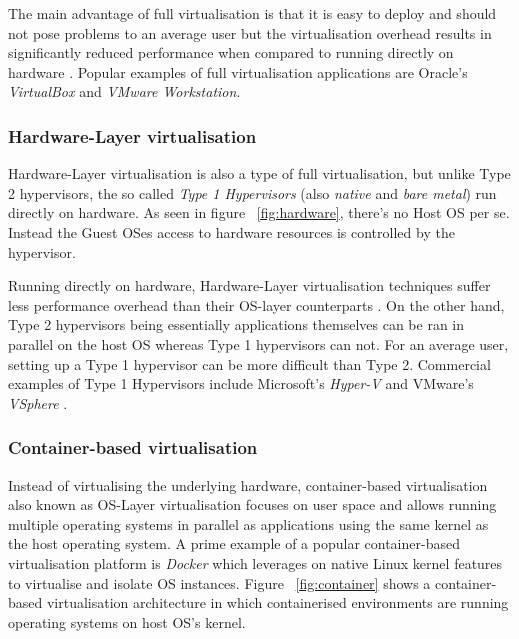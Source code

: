 
The main advantage of full virtualisation is that it is easy to deploy and should not pose problems to an average user but the virtualisation overhead results in significantly reduced performance when compared to running directly on hardware \cite{taxonomy}. Popular examples of full virtualisation applications are Oracle's \textit{VirtualBox}\cite{VirtualBox} and \textit{VMware Workstation}\cite{WorkStation}. 

\subsubsection{Hardware-Layer virtualisation}

Hardware-Layer virtualisation is also a type of full virtualisation, but unlike Type 2 hypervisors, the so called \textit{Type 1 Hypervisors} (also \textit{native} and \textit{bare metal}) run directly on hardware. As seen in figure ~\ref{fig:hardware}, there's no Host OS per se. Instead the Guest OSes access to hardware resources is controlled by the hypervisor.


Running directly on hardware, Hardware-Layer virtualisation techniques suffer less performance overhead than their OS-layer counterparts \cite{taxonomy}. On the other hand, Type 2 hypervisors being essentially applications themselves can be ran in parallel on the host OS whereas Type 1 hypervisors can not. For an average user, setting up a Type 1 hypervisor can be more difficult than Type 2. Commercial examples of Type 1 Hypervisors include Microsoft's \textit{Hyper-V}\cite{hyperv} and VMware's \textit{VSphere} \cite{vsphere}.

\subsubsection{Container-based virtualisation}

Instead of virtualising the underlying hardware, container-based virtualisation also known as OS-Layer virtualisation \cite{taxonomy} focuses on user space and allows running multiple operating systems in parallel as applications using the same kernel as the host operating system. A prime example of a popular container-based virtualisation platform is \textit{Docker} \cite{docker} which leverages on native Linux kernel features to virtualise and isolate OS instances. Figure ~\ref{fig:container} shows a container-based virtualisation architecture in which containerised environments are running operating systems on host OS's kernel. 

